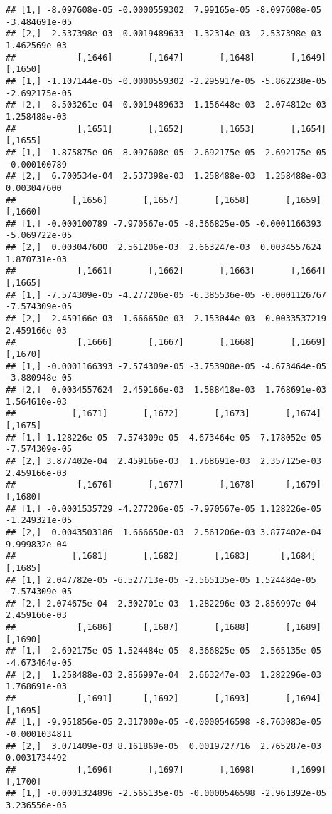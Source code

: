 \documentclass[
]{article}
\begin{document}
\begin{verbatim}
## [1,] -8.097608e-05 -0.0000559302  7.99165e-05 -8.097608e-05 -3.484691e-05
## [2,]  2.537398e-03  0.0019489633 -1.32314e-03  2.537398e-03  1.462569e-03
##            [,1646]       [,1647]       [,1648]       [,1649]       [,1650]
## [1,] -1.107144e-05 -0.0000559302 -2.295917e-05 -5.862238e-05 -2.692175e-05
## [2,]  8.503261e-04  0.0019489633  1.156448e-03  2.074812e-03  1.258488e-03
##            [,1651]       [,1652]       [,1653]       [,1654]      [,1655]
## [1,] -1.875875e-06 -8.097608e-05 -2.692175e-05 -2.692175e-05 -0.000100789
## [2,]  6.700534e-04  2.537398e-03  1.258488e-03  1.258488e-03  0.003047600
##           [,1656]       [,1657]       [,1658]       [,1659]       [,1660]
## [1,] -0.000100789 -7.970567e-05 -8.366825e-05 -0.0001166393 -5.069722e-05
## [2,]  0.003047600  2.561206e-03  2.663247e-03  0.0034557624  1.870731e-03
##            [,1661]       [,1662]       [,1663]       [,1664]       [,1665]
## [1,] -7.574309e-05 -4.277206e-05 -6.385536e-05 -0.0001126767 -7.574309e-05
## [2,]  2.459166e-03  1.666650e-03  2.153044e-03  0.0033537219  2.459166e-03
##            [,1666]       [,1667]       [,1668]       [,1669]       [,1670]
## [1,] -0.0001166393 -7.574309e-05 -3.753908e-05 -4.673464e-05 -3.880948e-05
## [2,]  0.0034557624  2.459166e-03  1.588418e-03  1.768691e-03  1.564610e-03
##           [,1671]       [,1672]       [,1673]       [,1674]       [,1675]
## [1,] 1.128226e-05 -7.574309e-05 -4.673464e-05 -7.178052e-05 -7.574309e-05
## [2,] 3.877402e-04  2.459166e-03  1.768691e-03  2.357125e-03  2.459166e-03
##            [,1676]       [,1677]       [,1678]      [,1679]       [,1680]
## [1,] -0.0001535729 -4.277206e-05 -7.970567e-05 1.128226e-05 -1.249321e-05
## [2,]  0.0043503186  1.666650e-03  2.561206e-03 3.877402e-04  9.999832e-04
##           [,1681]       [,1682]       [,1683]      [,1684]       [,1685]
## [1,] 2.047782e-05 -6.527713e-05 -2.565135e-05 1.524484e-05 -7.574309e-05
## [2,] 2.074675e-04  2.302701e-03  1.282296e-03 2.856997e-04  2.459166e-03
##            [,1686]      [,1687]       [,1688]       [,1689]       [,1690]
## [1,] -2.692175e-05 1.524484e-05 -8.366825e-05 -2.565135e-05 -4.673464e-05
## [2,]  1.258488e-03 2.856997e-04  2.663247e-03  1.282296e-03  1.768691e-03
##            [,1691]      [,1692]       [,1693]       [,1694]       [,1695]
## [1,] -9.951856e-05 2.317000e-05 -0.0000546598 -8.763083e-05 -0.0001034811
## [2,]  3.071409e-03 8.161869e-05  0.0019727716  2.765287e-03  0.0031734492
##            [,1696]       [,1697]       [,1698]       [,1699]       [,1700]
## [1,] -0.0001324896 -2.565135e-05 -0.0000546598 -2.961392e-05  3.236556e-05

\end{verbatim}
\end{document}
